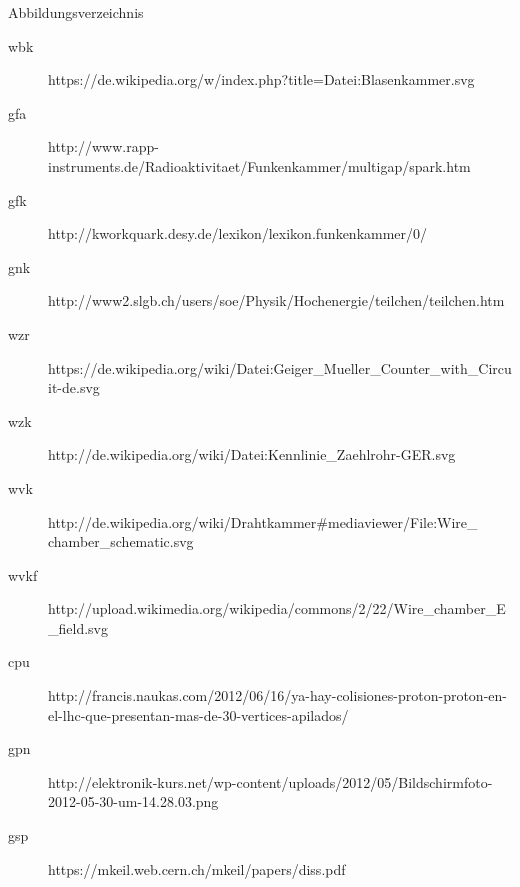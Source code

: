 \documentclass{beamer}
\begin{document}
\begin{frame}{Abbildungsverzeichnis}
\footnotesize
	\begin{adjustwidth}{-5em}{-2em}
	  	\begin{description}
		  	\item[wbk]
		  	https://de.wikipedia.org/w/index.php?title=Datei:Blasenkammer.svg
		  	\item[gfa]
		  	http://www.rapp-instruments.de/Radioaktivitaet/Funkenkammer/multigap/spark.htm
		  	\item[gfk]
		  	http://kworkquark.desy.de/lexikon/lexikon.funkenkammer/0/
		  	\item[gnk]
		  	http://www2.slgb.ch/users/soe/Physik/Hochenergie/teilchen/teilchen.htm
		  	\item[wzr]
		  	https://de.wikipedia.org/wiki/Datei:Geiger\_Mueller\_Counter\_with\_Circuit-de.svg
		  	\item[wzk]
			http://de.wikipedia.org/wiki/Datei:Kennlinie\_Zaehlrohr-GER.svg
			\item[wvk]
		  	http://de.wikipedia.org/wiki/Drahtkammer\#mediaviewer/File:Wire\_ chamber\_schematic.svg
		  	\item[wvkf]
		  	http://upload.wikimedia.org/wikipedia/commons/2/22/Wire\_chamber\_E\_field.svg
		  	\item[cpu]
		  	http://francis.naukas.com/2012/06/16/ya-hay-colisiones-proton-proton-en-el-lhc-que-presentan-mas-de-30-vertices-apilados/
		  	\item[gpn]
		  	http://elektronik-kurs.net/wp-content/uploads/2012/05/Bildschirmfoto-2012-05-30-um-14.28.03.png
		  	\item[gsp]
		  	https://mkeil.web.cern.ch/mkeil/papers/diss.pdf
		\end{description}
	\end{adjustwidth}  
\end{frame}
\end{document}
